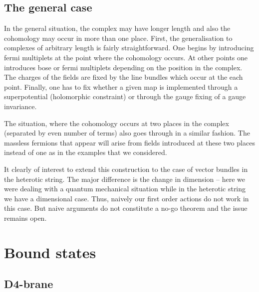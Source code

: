\documentclass[a4paper,12pt]{article}
\begin{document}
\subsection{The general case}

In the general situation, the complex may have longer length and also
the cohomology may occur in more than one place. First, the generalisation
to complexes of arbitrary length is fairly straightforward. One begins by
introducing fermi multiplets at the point where the cohomology occurs. At
other points one introduces bose or fermi multiplets depending on the 
position in the complex. The charges of the fields are fixed by the line
bundles which occur at the each point. Finally, one has to fix whether
a given map is implemented through a superpotential (holomorphic
constraint) or through the gauge fixing of a gauge invariance. 

The situation, where  the cohomology occurs at two places in the complex
(separated by even number of terms) also goes through in a similar fashion.
The massless fermions that appear will arise from fields introduced at
these two places instead of one as in the examples that we considered.

It clearly of interest to extend this construction to
the case of vector bundles in the heterotic string. The major difference
is the change in dimension -- here we were dealing with a quantum
mechanical situation while in the heterotic string
we have a \coordHE{} dimensional case. Thus, naively our first order actions
do not work in this case. But naive arguments do not constitute a no-go
theorem and the issue remains open. 


\section{Bound states}

\subsection{D4-brane}
\end{document}
